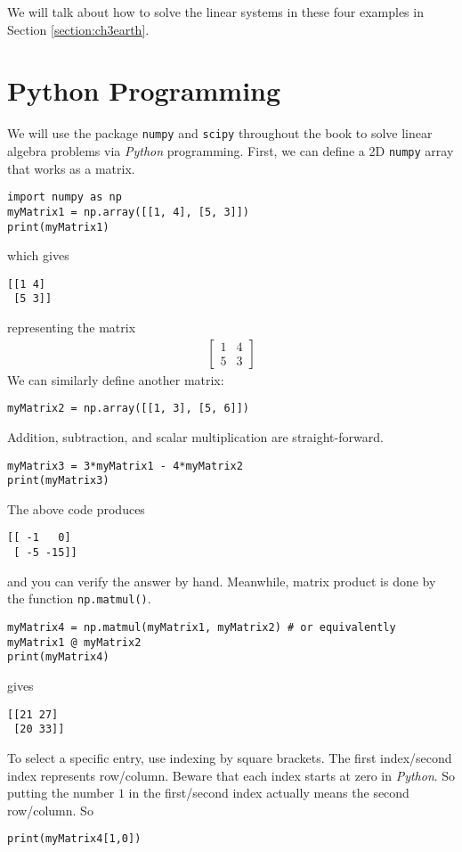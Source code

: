We will talk about how to solve the linear systems in these four examples in Section \ref{section:ch3earth}.

\section{Python Programming}
We will use the package \texttt{numpy} and \texttt{scipy} throughout the book to solve linear algebra problems via \textit{Python} programming. First, we can define a 2D \texttt{numpy} array that works as a matrix.
\begin{lstlisting}
import numpy as np
myMatrix1 = np.array([[1, 4], [5, 3]])
print(myMatrix1)
\end{lstlisting}
which gives
\begin{lstlisting}
[[1 4]
 [5 3]]
\end{lstlisting}
representing the matrix
\begin{align*}
\begin{bmatrix}
1 & 4 \\
5 & 3
\end{bmatrix}
\end{align*}
We can similarly define another matrix:
\begin{lstlisting}
myMatrix2 = np.array([[1, 3], [5, 6]])    
\end{lstlisting}
Addition, subtraction, and scalar multiplication are straight-forward.
\begin{lstlisting}
myMatrix3 = 3*myMatrix1 - 4*myMatrix2
print(myMatrix3)
\end{lstlisting}
The above code produces
\begin{lstlisting}
[[ -1   0]
 [ -5 -15]]
\end{lstlisting}
and you can verify the answer by hand. Meanwhile, matrix product is done by the function \texttt{np.matmul()}.
\begin{lstlisting}
myMatrix4 = np.matmul(myMatrix1, myMatrix2) # or equivalently myMatrix1 @ myMatrix2
print(myMatrix4)
\end{lstlisting}
gives
\begin{lstlisting}
[[21 27]
 [20 33]]
\end{lstlisting}
To select a specific entry, use indexing by square brackets. The first index/second index represents row/column. Beware that each index starts at zero in \textit{Python}. So putting the number $1$ in the first/second index actually means the second row/column. So
\begin{lstlisting}
print(myMatrix4[1,0])
\end{lstlisting}
